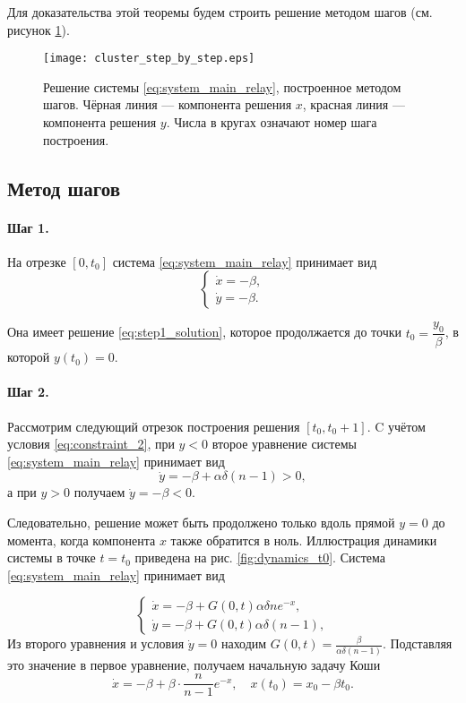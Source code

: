 Для доказательства этой теоремы будем строить решение методом шагов (см. рисунок \ref{fig:cluster_step_by_step}).

\begin{figure}[!ht]
	\centering
	\texttt{[image: cluster\_step\_by\_step.eps]}
	\caption{Решение системы \eqref{eq:system_main_relay}, построенное методом шагов. Чёрная линия --- компонента решения $x$, красная линия --- компонента решения $y$. Числа в кругах означают номер шага построения.}
	\label{fig:cluster_step_by_step}
\end{figure}


\subsection{Метод шагов}
\paragraph{Шаг 1.} На отрезке $[0, t_0]$ система \eqref{eq:system_main_relay} принимает вид
%
\begin{equation}
	\label{eq:step1_system}
	\begin{cases}
		\dot{x} = -\beta,\\
		\dot{y} = -\beta.
	\end{cases}
\end{equation}

Она имеет решение \eqref{eq:step1_solution}, которое продолжается до точки $t_0 = \dfrac{y_0}{\beta}$, в которой $y(t_0) = 0$.

\paragraph{Шаг 2.} Рассмотрим следующий отрезок построения решения $[t_0, t_0 + 1]$. C учётом условия \eqref{eq:constraint_2}, при $y < 0$ второе уравнение системы \eqref{eq:system_main_relay} принимает вид
\[
\dot{y} = -\beta + \alpha \delta (n - 1) > 0,
\]
а при $y > 0$ получаем $\dot{y} = -\beta < 0$.

Следовательно, решение может быть продолжено только вдоль прямой $y = 0$ до момента, когда компонента $x$ также обратится в ноль. Иллюстрация динамики системы в точке $t= t_0$ приведена на рис. \ref{fig:dynamics_t0}. Система \eqref{eq:system_main_relay} принимает вид

\begin{equation}
	\label{eq:step2_system}
	\begin{cases}
		\dot{x} = -\beta + G(0, t) \alpha \delta n e^{-x},\\
		\dot{y} = -\beta + G(0, t) \alpha \delta (n - 1),
	\end{cases}
\end{equation}
%
Из второго уравнения и условия $\dot{y} = 0$ находим $G(0, t) = \frac{\beta}{\alpha \delta (n - 1)}$. Подставляя это значение в первое уравнение, получаем начальную задачу Коши
\begin{equation}
	\label{eq:step2_start}
	\dot{x} = -\beta + \beta\cdot\dfrac{n}{n - 1}e^{-x}, \quad x(t_0) = x_0 - \beta t_0.
\end{equation}

